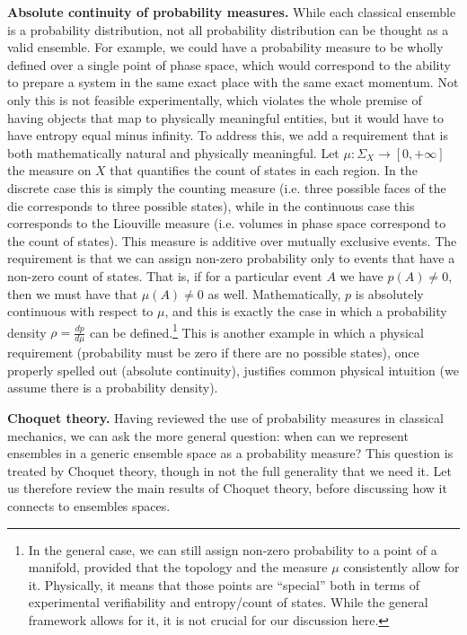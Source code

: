 \documentclass[10pt,twocolumn, nofootinbib]{revtex4-2}
\begin{document}
\textbf{Absolute continuity of probability measures.} While each classical ensemble is a probability distribution, not all probability distribution can be thought as a valid ensemble. For example, we could have a probability measure to be wholly defined over a single point of phase space, which would correspond to the ability to prepare a system in the same exact place with the same exact momentum. Not only this is not feasible experimentally, which violates the whole premise of having objects that map to physically meaningful entities, but it would have to have entropy equal minus infinity. To address this, we add a requirement that is both mathematically natural and physically meaningful. Let $\mu : \Sigma_X \to [0, + \infty]$ the measure on $X$ that quantifies the count of states in each region. In the discrete case this is simply the counting measure (i.e. three possible faces of the die corresponds to three possible states), while in the continuous case this corresponds to the Liouville measure (i.e. volumes in phase space correspond to the count of states). This measure is additive over mutually exclusive events. The requirement is that we can assign non-zero probability only to events that have a non-zero count of states. That is, if for a particular event $A$ we have $p(A) \neq 0$, then we must have that $\mu(A) \neq 0$ as well. Mathematically, $p$ is absolutely continuous with respect to $\mu$, and this is exactly the case in which a probability density $\rho = \frac{dp}{d\mu}$ can be defined.\footnote{In the general case, we can still assign non-zero probability to a point of a manifold, provided that the topology and the measure $\mu$ consistently allow for it. Physically, it means that those points are ``special'' both in terms of experimental verifiability and entropy/count of states. While the general framework allows for it, it is not crucial for our discussion here.} This is another example in which a physical requirement (probability must be zero if there are no possible states), once properly spelled out (absolute continuity), justifies common physical intuition (we assume there is a probability density).


\textbf{Choquet theory.} Having reviewed the use of probability measures in classical mechanics, we can ask the more general question: when can we represent ensembles in a generic ensemble space as a probability measure? This question is treated by Choquet theory, though in not the full generality that we need it. Let us therefore review the main results of Choquet theory, before discussing how it connects to ensembles spaces.
\end{document}
